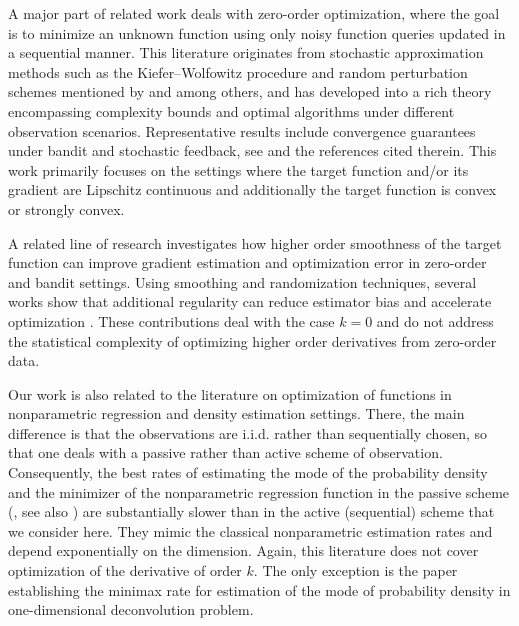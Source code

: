 \documentclass{article}
\theoremstyle{definition}
\begin{document}
A major part of related work deals with zero-order optimization, where the goal is to minimize an unknown function using only noisy function queries updated in a sequential manner. This literature originates from stochastic approximation methods such as the Kiefer--Wolfowitz procedure 
\citep{kiefer1952stochastic} and random perturbation schemes mentioned by \cite{nemirovski1983mirror} and
\citep{spall2002multivariate} among others, and has developed into a rich theory encompassing complexity bounds and optimal algorithms under different observation scenarios. Representative results include 
convergence guarantees under bandit and stochastic feedback, see 
\citep{flaxman2004online,agarwal2010optimal,jamieson2012,ghadimi2013stochastic,
duchi2015optimal,shamir2017optimal,balasubramanian2021zeroth,nesterov2017random} and the references cited therein. This work primarily focuses on the settings where the target function and/or its gradient are Lipschitz continuous and additionally the target function is convex or strongly convex. 

A related line of research investigates how higher order smoothness of the target function can improve gradient estimation and optimization error in zero-order and bandit settings. Using smoothing and randomization techniques, several works show that additional regularity can reduce estimator bias and accelerate 
optimization \citep{polyak1990optimal,bach2016highly,akhavan2020exploiting,akhavan2021distributed,novitskii2021improved,akhavan2024gradient,yu2024stochastic,Akhavan2025GradientfreeSO}. These 
contributions deal with the case $k=0$ and do not address the statistical complexity of optimizing higher order derivatives from zero-order data.

Our work is also related to the literature on optimization of functions in nonparametric regression and density estimation settings. There, the main difference is that the observations are i.i.d. rather than sequentially chosen, so that one deals with a passive rather than active scheme of observation. Consequently, the best rates of estimating the mode of the probability density \cite{tsybakov1990recursive} and the minimizer of the nonparametric regression function in the passive scheme (\cite{tsybakov1990passive}, see also \cite{nazin-polyak-tsybakov-1989,nazin-polyak-tsybakov,passive2022,akhavan2024estimating}) are substantially slower than in the active (sequential) scheme that we consider here. They mimic the classical nonparametric estimation rates and depend exponentially on the dimension. Again, this literature does not cover optimization of the derivative of order $k$. The only exception is the paper \cite{wieczorek2010optimal} establishing the minimax rate for estimation of the mode of probability density in one-dimensional deconvolution problem.
\end{document}
